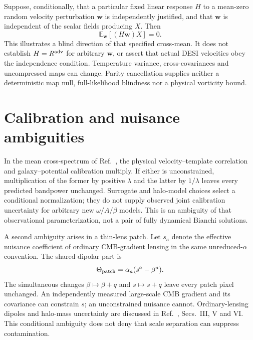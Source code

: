 \documentclass[aps,prd,reprint,onecolumn,notitlepage,nofootinbib]{revtex4-2}
\newcommand{\vect}[1]{\boldsymbol{#1}}
\begin{document}
Suppose, conditionally, that a particular fixed linear response $H$ to a mean-zero random velocity perturbation $\vect w$ is independently justified, and that $\vect w$ is independent of the scalar fields producing $X$. Then
\begin{equation}
 \mathbb E_{\vect w}[(H\vect w)X]=0.
\end{equation}
This illustrates a blind direction of that specified cross-mean. It does not establish $H=R^{\rm adv}$ for arbitrary $\vect w$, or assert that actual DESI velocities obey the independence condition. Temperature variance, cross-covariances and uncompressed maps can change. Parity cancellation supplies neither a deterministic map null, full-likelihood blindness nor a physical vorticity bound.

\section{Calibration and nuisance ambiguities}

In the mean cross-spectrum of Ref.~\cite{actdesi}, the physical velocity--template correlation and galaxy--potential calibration multiply. If either is unconstrained, multiplication of the former by positive $\lambda$ and the latter by $1/\lambda$ leaves every predicted bandpower unchanged. Surrogate and halo-model choices select a conditional normalization; they do not supply observed joint calibration uncertainty for arbitrary new $\omega/A/\beta$ models. This is an ambiguity of that observational parameterization, not a pair of fully dynamical Bianchi solutions.

A second ambiguity arises in a thin-lens patch. Let $s_a$ denote the effective nuisance coefficient of ordinary CMB-gradient lensing in the same unreduced-$\alpha$ convention. The shared dipolar part is
\begin{equation}
 \Theta_{\rm patch}=\alpha_a(s^a-\beta^a).
\end{equation}
The simultaneous changes $\beta\mapsto\beta+q$ and $s\mapsto s+q$ leave every patch pixel unchanged. An independently measured large-scale CMB gradient and its covariance can constrain $s$; an unconstrained nuisance cannot. Ordinary-lensing dipoles and halo-mass uncertainty are discussed in Ref.~\cite{hotinli2020}, Secs.~III, V and VI. This conditional ambiguity does not deny that scale separation can suppress contamination.
\end{document}
